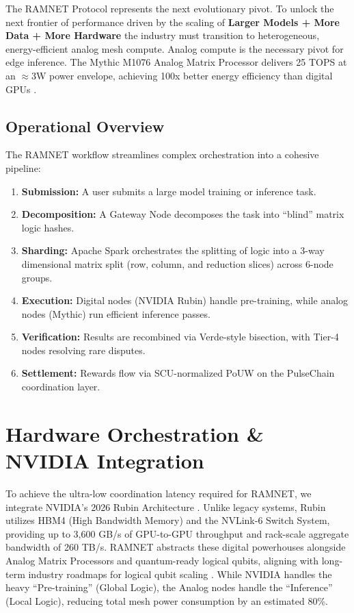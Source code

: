 \documentclass[conference]{IEEEtran}
\begin{document}
The RAMNET Protocol represents the next evolutionary pivot. To unlock the next frontier of performance driven by the scaling of \textbf{Larger Models + More Data + More Hardware} the industry must transition to heterogeneous, energy-efficient analog mesh compute. Analog compute is the necessary pivot for edge inference. The Mythic M1076 Analog Matrix Processor delivers 25 TOPS at an $\approx$3W power envelope, achieving 100x better energy efficiency than digital GPUs \cite{mythic2024m1076}.

\subsection{Operational Overview}
The RAMNET workflow streamlines complex orchestration into a cohesive pipeline:
\begin{enumerate}
    \item \textbf{Submission:} A user submits a large model training or inference task.
    \item \textbf{Decomposition:} A Gateway Node decomposes the task into ``blind'' matrix logic hashes.
    \item \textbf{Sharding:} Apache Spark orchestrates the splitting of logic into a 3-way dimensional matrix split (row, column, and reduction slices) across 6-node groups.
    \item \textbf{Execution:} Digital nodes (NVIDIA Rubin) handle pre-training, while analog nodes (Mythic) run efficient inference passes.
    \item \textbf{Verification:} Results are recombined via Verde-style bisection, with Tier-4 nodes resolving rare disputes.
    \item \textbf{Settlement:} Rewards flow via SCU-normalized PoUW on the PulseChain coordination layer.
\end{enumerate}

\section{Hardware Orchestration \& NVIDIA Integration}
To achieve the ultra-low coordination latency required for RAMNET, we integrate NVIDIA's 2026 Rubin Architecture \cite{nvidia2026rubin}. Unlike legacy systems, Rubin utilizes HBM4 (High Bandwidth Memory) and the NVLink-6 Switch System, providing up to 3,600 GB/s of GPU-to-GPU throughput and rack-scale aggregate bandwidth of 260 TB/s. RAMNET abstracts these digital powerhouses alongside Analog Matrix Processors and quantum-ready logical qubits, aligning with long-term industry roadmaps for logical qubit scaling \cite{ibm2024roadmap}. While NVIDIA handles the heavy ``Pre-training'' (Global Logic), the Analog nodes handle the ``Inference'' (Local Logic), reducing total mesh power consumption by an estimated 80\%.
\end{document}
